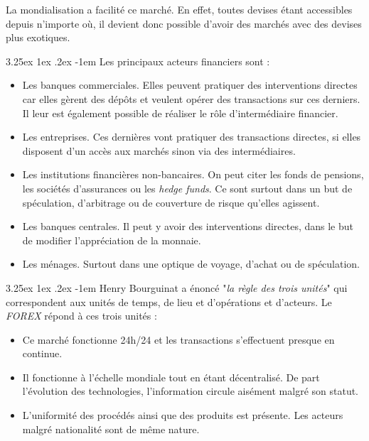 \documentclass[a4paper, 11pt]{article}
\makeatletter
\renewcommand\paragraph{\@startsection{paragraph}{5}{\z@}%
  {3.25ex \@plus1ex \@minus.2ex}%
  {-1em}%
  {\normalfont\normalsize\bfseries}}
\makeatother
\begin{document}
La mondialisation a facilité ce marché. En effet, toutes devises étant accessibles depuis 
n'importe où, il devient donc possible d'avoir des marchés avec des devises plus exotiques.

\paragraph{}
Les principaux acteurs financiers sont \cite{marche_des_changes}:
\begin{itemize}
\item Les banques commerciales. 
Elles peuvent pratiquer des interventions directes car elles gèrent des dépôts et veulent opérer des transactions sur ces derniers.
Il leur est également possible de réaliser le rôle d'intermédiaire financier.

\item Les entreprises. Ces dernières vont pratiquer des transactions directes, si elles disposent d'un accès aux marchés
sinon via des intermédiaires.

\item Les institutions financières non-bancaires. On peut citer les fonds de pensions, les sociétés d'assurances
ou les \textit{hedge funds}. Ce sont surtout dans un but de spéculation, d'arbitrage ou de couverture de risque qu'elles agissent.

\item Les banques centrales. Il peut y avoir des interventions directes, dans le but de modifier l'appréciation de la monnaie.

\item Les ménages. Surtout dans une optique de voyage, d'achat ou de spéculation.
\end{itemize}

\paragraph{}
Henry Bourguinat a énoncé "\textit{la règle des trois unités}" qui correspondent aux unités de temps, de lieu 
et d'opérations et d'acteurs.
Le \textit{FOREX} répond à ces trois unités \cite{site_fr_forex}:
\begin{itemize}
\item Ce marché fonctionne 24h/24 et les transactions s'effectuent presque en continue.

\item Il fonctionne à l'échelle mondiale tout en étant décentralisé. 
De part l'évolution des technologies, l'information circule aisément malgré son statut.

\item L'uniformité des procédés ainsi que des produits est présente. Les acteurs malgré nationalité sont de même nature.
\end{itemize}
\end{document}
